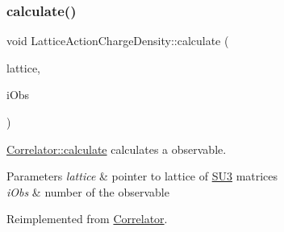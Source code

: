 \subsubsection{\texorpdfstring{calculate()}{calculate()}}
{\footnotesize\ttfamily void Lattice\+Action\+Charge\+Density\+::calculate (\begin{DoxyParamCaption}\item[{\mbox{\hyperlink{class_lattice}{Lattice}}$<$ \mbox{\hyperlink{class_s_u3}{S\+U3}} $>$ $\ast$}]{lattice,  }\item[{unsigned int}]{i\+Obs }\end{DoxyParamCaption})\hspace{0.3cm}{\ttfamily [virtual]}}



\mbox{\hyperlink{class_correlator_ab33502ff305f891c5c2e6d66a26a0247}{Correlator\+::calculate}} calculates a observable. 


\begin{DoxyParams}{Parameters}
{\em lattice} & pointer to lattice of \mbox{\hyperlink{class_s_u3}{S\+U3}} matrices \\
\hline
{\em i\+Obs} & number of the observable \\
\hline
\end{DoxyParams}


Reimplemented from \mbox{\hyperlink{class_correlator_ab33502ff305f891c5c2e6d66a26a0247}{Correlator}}.

